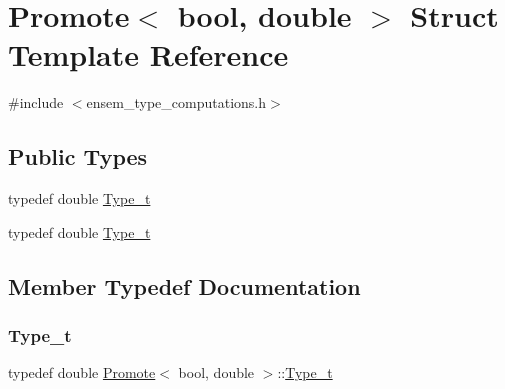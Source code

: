 \hypertarget{structPromote_3_01bool_00_01double_01_4}{}\section{Promote$<$ bool, double $>$ Struct Template Reference}
\label{structPromote_3_01bool_00_01double_01_4}


{\ttfamily \#include $<$ensem\+\_\+type\+\_\+computations.\+h$>$}

\subsection*{Public Types}
\begin{DoxyCompactItemize}
\item 
typedef double \mbox{\hyperlink{structPromote_3_01bool_00_01double_01_4_a89d90c1b19975ea58462741364f3d29e}{Type\+\_\+t}}
\item 
typedef double \mbox{\hyperlink{structPromote_3_01bool_00_01double_01_4_a89d90c1b19975ea58462741364f3d29e}{Type\+\_\+t}}
\end{DoxyCompactItemize}


\subsection{Member Typedef Documentation}
\mbox{\label{structPromote_3_01bool_00_01double_01_4_a89d90c1b19975ea58462741364f3d29e}} 
\subsubsection{\texorpdfstring{Type\_t}{Type\_t}\hspace{0.1cm}{\footnotesize\ttfamily [1/2]}}
{\footnotesize\ttfamily typedef double \mbox{\hyperlink{structPromote}{Promote}}$<$ bool, double $>$\+::\mbox{\hyperlink{structPromote_3_01bool_00_01double_01_4_a89d90c1b19975ea58462741364f3d29e}{Type\+\_\+t}}}

\mbox{\label{structPromote_3_01bool_00_01double_01_4_a89d90c1b19975ea58462741364f3d29e}} 
